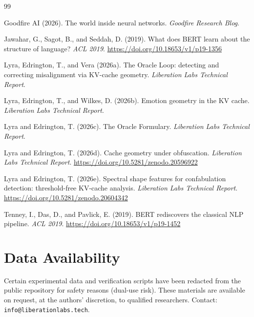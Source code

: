 \documentclass[11pt,a4paper]{article}
\begin{document}
\begin{thebibliography}{99}

Goodfire AI (2026).
The world inside neural networks.
\textit{Goodfire Research Blog}.

Jawahar, G., Sagot, B., and Seddah, D. (2019).
What does BERT learn about the structure of language?
\textit{ACL 2019}.
\url{https://doi.org/10.18653/v1/p19-1356}

Lyra, Edrington, T., and Vera (2026a).
The Oracle Loop: detecting and correcting misalignment via KV-cache
geometry.
\textit{Liberation Labs Technical Report}.

Lyra, Edrington, T., and Wilkes, D. (2026b).
Emotion geometry in the KV cache.
\textit{Liberation Labs Technical Report}.

Lyra and Edrington, T. (2026c).
The Oracle Formulary.
\textit{Liberation Labs Technical Report}.

Lyra and Edrington, T. (2026d).
Cache geometry under obfuscation.
\textit{Liberation Labs Technical Report}.
\url{https://doi.org/10.5281/zenodo.20596922}

Lyra and Edrington, T. (2026e).
Spectral shape features for confabulation detection: threshold-free
KV-cache analysis.
\textit{Liberation Labs Technical Report}.
\url{https://doi.org/10.5281/zenodo.20604342}

Tenney, I., Das, D., and Pavlick, E. (2019).
BERT rediscovers the classical NLP pipeline.
\textit{ACL 2019}.
\url{https://doi.org/10.18653/v1/p19-1452}

\end{thebibliography}

\section*{Data Availability}
Certain experimental data and verification scripts have been redacted from the
public repository for safety reasons (dual-use risk). These materials are
available on request, at the authors' discretion, to qualified researchers. Contact:
\texttt{info@liberationlabs.tech}.
\end{document}
